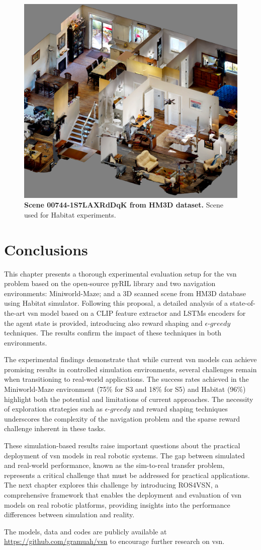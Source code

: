 \begin{figure}
    \centering
    \includegraphics[width=0.6\linewidth]{figures/understanding_vsn/dollhouse}
    \caption{\textbf{Scene 00744-1S7LAXRdDqK from HM3D dataset.} Scene used for Habitat experiments.}
    \label{fig:dollhouse}
\end{figure}

\section{Conclusions}
\label{sec:conclusions}

This chapter presents a thorough experimental evaluation setup for the \acrshort{vsn} problem based on the open-source pyRIL library and two navigation environments: Miniworld-Maze; and a 3D scanned scene from HM3D database using Habitat simulator.
Following this proposal, a detailed analysis of a state-of-the-art \acrshort{vsn} model based on a CLIP feature extractor and LSTMs encoders for the agent state is provided, introducing also reward shaping and $\epsilon\text{-}greedy$ techniques.
The results confirm the impact of these techniques in both environments.

The experimental findings demonstrate that while current \acrshort{vsn} models can achieve promising results in controlled simulation environments, several challenges remain when transitioning to real-world applications.
The success rates achieved in the Miniworld-Maze environment (75\% for S3 and 18\% for S5) and Habitat (96\%) highlight both the potential and limitations of current approaches.
The necessity of exploration strategies such as $\epsilon\text{-}greedy$ and reward shaping techniques underscores the complexity of the navigation problem and the sparse reward challenge inherent in these tasks.

These simulation-based results raise important questions about the practical deployment of \acrshort{vsn} models in real robotic systems.
The gap between simulated and real-world performance, known as the sim-to-real transfer problem, represents a critical challenge that must be addressed for practical applications.
The next chapter explores this challenge by introducing ROS4VSN, a comprehensive framework that enables the deployment and evaluation of \acrshort{vsn} models on real robotic platforms, providing insights into the performance differences between simulation and reality.

The models, data and codes are publicly available at \url{https://github.com/gramuah/vsn} to encourage further research on \acrshort{vsn}\@.